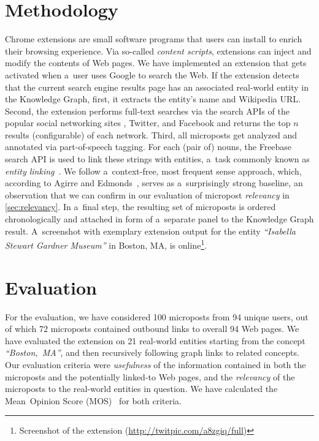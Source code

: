 \section{Methodology}
Chrome extensions are small software programs that users can install
to enrich their browsing experience.
Via so-called \emph{content scripts}, extensions can inject and modify the contents of Web pages.
We have implemented an extension that gets activated when a~user uses Google to search the Web.
If the extension detects that the current search engine results page
has an associated real-world entity in the Knowledge Graph,
first, it extracts the entity's name and Wikipedia URL.
Second, the extension performs full-text searches via the search APIs of
the popular social networking sites \googleplus, Twitter, and Facebook
and returns the top $n$ results (configurable) of each network.
Third, all microposts get analyzed and annotated via part-of-speech tagging.
For each (pair of) nouns, the Freebase search API is used
to link these strings with entities,
a~task commonly known as \emph{entity linking}~\cite{spitkovsky2012}.
We follow a~context-free, most frequent sense approach,
which, according to Agirre and Edmonds~\cite{agirre2007},
serves as a~surprisingly strong baseline,
an observation that we can confirm in our evaluation of micropost \emph{relevancy}
in \autoref{sec:relevancy}.
In a~final step, the resulting set of microposts is ordered chronologically
and attached in form of a~separate panel to the Knowledge Graph result.
A~screenshot with exemplary extension output for the entity
\emph{``Isabella Stewart Gardner Museum''} in Boston, MA,
is online\footnote{Screenshot of the extension (\url{http://twitpic.com/a8zgiq/full})}. 

\section{Evaluation}
For the evaluation, we have considered 100 microposts from 94 unique users,
out of which 72 microposts contained outbound links to overall 94 Web pages.
We have evaluated the extension on 21 real-world entities starting from the concept
\emph{``Boston,~MA''}, and then recursively following graph links to related concepts.
Our evaluation criteria were \emph{usefulness} of the information
contained in both the microposts and the potentially linked-to Web pages,
and the \emph{relevancy} of the microposts to the real-world entities in question.
We have calculated the Mean~Opinion Score (MOS)~\cite{mos1998} for both criteria.

